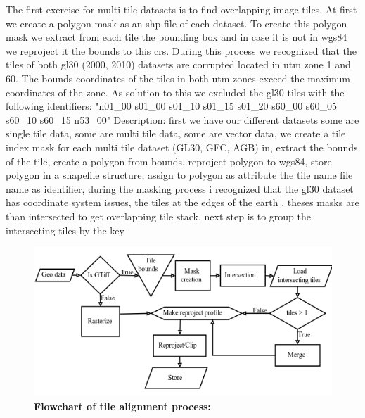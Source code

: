 		The first exercise for multi tile datasets is to find overlapping image tiles. At first we create a polygon mask as an shp-file of each dataset. To create this polygon mask we extract from each tile the bounding box and in case it is not in wgs84 we reproject it the bounds to this crs. During this process we recognized that the tiles of both gl30 (2000, 2010) datasets are corrupted located in utm zone 1 and 60. The  bounds coordinates of the tiles in both utm zones exceed the maximum coordinates of the zone. As solution to this we excluded the gl30 tiles with the following identifiers: "n01\_00 s01\_00 s01\_10 s01\_15 s01\_20 s60\_00 s60\_05 s60\_10 s60\_15 n53\_00"  
		Description: first we have our different datasets some are single tile data, some are multi tile data, some are vector data, we create a tile index mask for each multi tile dataset (GL30, GFC, AGB) in, extract the bounds of the tile, create a polygon from bounds, reproject polygon to wgs84, store polygon in a shapefile structure, assign to polygon as attribute the tile name file name as identifier, during the masking process i recognized that the gl30 dataset has coordinate system issues, the tiles at the edges of the earth , theses masks are than intersected to get overlapping tile stack, next step is to group the intersecting tiles by the key 
		\begin{figure}[ht]
			\centering
			\includegraphics[scale=.8]{img/align}
			\caption[Flowchart of tile alignment process]{\textbf{Flowchart of tile alignment process:} }
			\label{fig:align}
		\end{figure}
